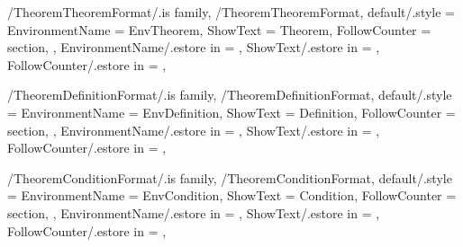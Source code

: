 
\pgfkeys
{
  /TheoremTheoremFormat/.is family, /TheoremTheoremFormat,
  default/.style =
  {
    EnvironmentName = {EnvTheorem},
    ShowText = {Theorem},
    FollowCounter = section,
  },
  EnvironmentName/.estore in = \GetTheoremTheoremFormatEnvironmentName,
  ShowText/.estore in = \GetTheoremTheoremFormatShowText,
  FollowCounter/.estore in = \GetTheoremTheoremFormatFollowCounter,
} %

\newcommand{\InsertTheorem}[2][\empty]
{%
  \InsertTheoremContent[#1]{\GetTheoremTheoremFormatEnvironmentName}{#2}%
} %

\newcommand{\InitTheoremTheoremFormat}
{%
  \ifthenelse{\equal{\GetTheoremTheoremFormatFollowCounter}{\empty}}%
  {%
    \newtheorem{%
      \GetTheoremTheoremFormatEnvironmentName}{%
      \GetTheoremTheoremFormatShowText}%
  }%
  {%
    \newtheorem{%
      \GetTheoremTheoremFormatEnvironmentName}{%
      \GetTheoremTheoremFormatShowText}[%
      \GetTheoremTheoremFormatFollowCounter]%
  }%
} %


\pgfkeys
{
  /TheoremDefinitionFormat/.is family, /TheoremDefinitionFormat,
  default/.style =
  {
    EnvironmentName = {EnvDefinition},
    ShowText = {Definition},
    FollowCounter = section,
  },
  EnvironmentName/.estore in = \GetTheoremDefinitionFormatEnvironmentName,
  ShowText/.estore in = \GetTheoremDefinitionFormatShowText,
  FollowCounter/.estore in = \GetTheoremDefinitionFormatFollowCounter,
} %

\newcommand{\InsertDefinition}[2][\empty]
{%
  \InsertTheoremContent[#1]{\GetTheoremDefinitionFormatEnvironmentName}{#2}%
} %

\newcommand{\InitTheoremDefinitionFormat}
{%
  \ifthenelse{\equal{\GetTheoremDefinitionFormatFollowCounter}{\empty}}%
  {%
    \newtheorem{%
      \GetTheoremDefinitionFormatEnvironmentName}{%
      \GetTheoremDefinitionFormatShowText}%
  }%
  {%
    \newtheorem{%
      \GetTheoremDefinitionFormatEnvironmentName}{%
      \GetTheoremDefinitionFormatShowText}[%
      \GetTheoremDefinitionFormatFollowCounter]%
  }%
} %


\pgfkeys
{
  /TheoremConditionFormat/.is family, /TheoremConditionFormat,
  default/.style =
  {
    EnvironmentName = {EnvCondition},
    ShowText = {Condition},
    FollowCounter = section,
  },
  EnvironmentName/.estore in = \GetTheoremConditionFormatEnvironmentName,
  ShowText/.estore in = \GetTheoremConditionFormatShowText,
  FollowCounter/.estore in = \GetTheoremConditionFormatFollowCounter,
} %

